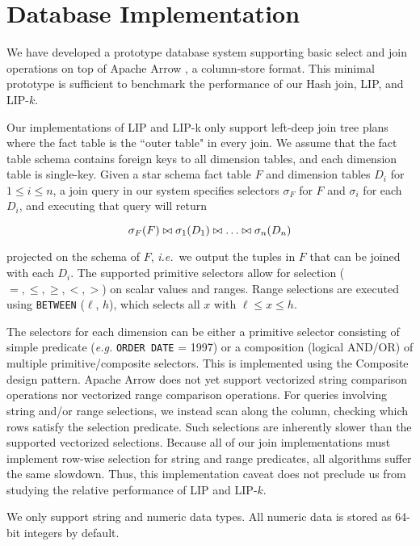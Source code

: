 

\section{Database Implementation}

We have developed a prototype database system supporting basic select and join operations on top of Apache Arrow \cite{apachearrow}, a column-store format. This minimal prototype is sufficient to benchmark the performance of our Hash join, LIP, and LIP-$k$.

Our implementations of LIP and LIP-k only support left-deep join tree plans where the fact table is the ``outer table" in every join. We assume that the fact table schema contains foreign keys to all dimension tables, and each dimension table is single-key. Given a star schema fact table $F$ and dimension tables $D_i$ for $1 \leq i \leq n$, a join query in our system specifies selectors $\sigma_F$ for $F$ and $\sigma_i$ for each $D_i$, and executing that query will return 

$$\sigma_F(F) \bowtie \sigma_1(D_1) \bowtie \dots \bowtie \sigma_n(D_n)$$

\noindent projected on the schema of $F$, {\it i.e.}~we output the tuples in $F$ that can be joined with each $D_i$. The supported primitive selectors allow for selection ($=, \leq, \geq, <, >$) on scalar values and ranges. Range selections are executed using \texttt{BETWEEN} ($\ell$, $h$), which selects all $x$ with $\ell \leq x \leq h$. 

The selectors for each dimension can be either a primitive selector consisting of simple predicate ({\it e.g.} \texttt{ORDER DATE} = 1997) 
or a composition (logical AND/OR) of multiple primitive/composite selectors. 
This is implemented using the Composite design pattern.
Apache Arrow does not yet support vectorized string comparison operations nor vectorized range comparison operations.
For queries involving string and/or range selections, 
we instead scan along the column, checking which rows satisfy the selection predicate. 
Such selections are inherently slower than the supported vectorized selections. 
Because all of our join implementations must implement row-wise selection for string and range predicates, 
all algorithms suffer the same slowdown. 
Thus, this implementation caveat does not preclude us from studying the relative performance of LIP and LIP-$k$.

We only support string and numeric data types. All numeric data is stored as 64-bit integers by default.

